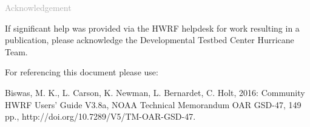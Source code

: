 \begin{titlepage}
\vspace*{0.5cm}
\noindent

\begin{flushleft}
\textcolor{darkgray}{\LARGE Acknowledgement}
\vspace*{1cm}\par

If significant help was provided via the HWRF helpdesk for work resulting in a publication, please acknowledge the Developmental Testbed Center Hurricane Team.\\
\vspace*{1cm}\par
For referencing this document please use:\\ 
\vspace*{1cm}\par
Biswas, M. K., L. Carson, K. Newman, L. Bernardet, C. Holt, 2016: Community HWRF Users' Guide V3.8a, NOAA Technical Memorandum OAR GSD-47, 149 pp., http://doi.org/10.7289/V5/TM-OAR-GSD-47.

\end{flushleft}
\end{titlepage}
\pagebreak{}




